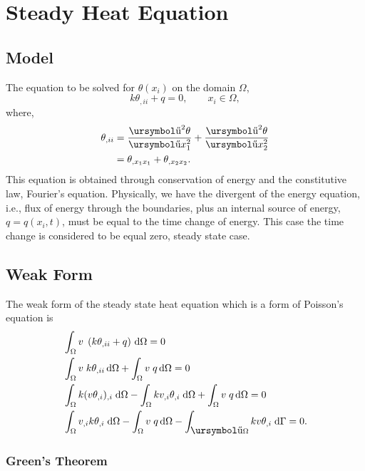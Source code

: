 \documentclass[10pt, a4paper]{article}
\def\urpartial{\mbox{\ursymbol\char"B6}}
\begin{document}
\section{Steady Heat Equation}

\subsection{Model}

The equation to be solved for $\theta(x_i)$ on the domain $\Omega$,
	\begin{equation}
	k \theta_{,ii} + q = 0 , \qquad x_i \in \Omega,
	\end{equation}
where,
\begin{align*}
\theta_{,ii} &= \dfrac{\urpartial ^2 \theta}{\urpartial  x_1^2} + \dfrac{\urpartial ^2 \theta}{\urpartial  x_2^2}\\
&= \theta_{,x_1x_1} + \theta_{,x_2x_2} .
\end{align*}
This equation is obtained through conservation of energy and the constitutive law, Fourier's equation. Physically, we have the divergent of the energy equation, i.e., flux of energy through the boundaries, plus an internal source of energy, $q = q(x_i, t)$, must be equal to the time change of energy. This case the time change is considered to be equal zero, steady state case.

\subsection{Weak Form}

The weak form of the steady state heat equation which is a form of Poisson's equation is
\begin{align*}
&\int_{\Omega} v \; \left(k \theta_{,ii} + q \right) \, \mathrm{d}\Omega = 0\\
& \int_{\Omega} v \;  k \theta_{,ii} \, \mathrm{d}\Omega + \int_{\Omega}  v\; q  \, \mathrm{d}\Omega  =  0 \\
& \int_{\Omega} k  (v\theta_{,i})_{,i} \; \mathrm{d}\Omega - \int_{\Omega}k v_{,i} \theta_{,i}  \; \mathrm{d}\Omega +  \int_{\Omega}  v\; q  \, \mathrm{d}\Omega =  0 \\
& \int_{\Omega} v_{,i}k \theta_{,i}  \; \mathrm{d}\Omega    -
 \int_{\Omega}  v\; q  \, \mathrm{d}\Omega - 
 \int_{\urpartial \Omega} k  v\theta_{,i}\; \mathrm{d}\Gamma = 0.
\end{align*}


\subsubsection{Green's Theorem}
\end{document}
